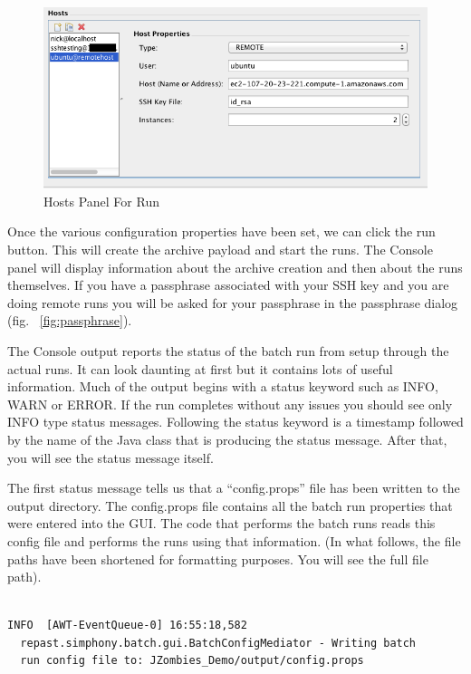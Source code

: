 \documentclass[11pt]{amsart}
\begin{document}
\begin{figure}[h]
\begin{center}
\vspace{.2in}
\centerline {
\includegraphics[width=6in]{images/hosts_panel_run.png}
}
\caption{Hosts Panel For Run}
\label{fig:hosts_panel_run}
\end{center}
\end{figure}


Once the various configuration properties have been set, we can click the run button. This will create the archive payload and start the runs. The Console panel will display information about the archive creation and then about the runs themselves. If you have a passphrase associated with your SSH key and you are doing remote runs you will be asked for  your passphrase in the passphrase dialog (fig. ~\ref{fig:passphrase}).

The Console output reports the status of the batch run from setup through the actual runs. It can look daunting at first but it contains lots of useful information. Much of the output begins with a status keyword such as INFO, WARN or ERROR. If the run completes without any issues you should see only INFO type status messages. Following the status keyword is a timestamp followed by the name of the Java class that is producing the status message. After that, you will see the status message itself.

The first status message tells us that a ``config.props'' file has been written to the output directory. The config.props file
contains all the batch run properties that were entered into the GUI. The code that performs the batch runs reads this config file and performs the runs using that information. (In what follows, the file paths have been shortened for formatting purposes.  You will see the full file path).

\begin{verbatim}

INFO  [AWT-EventQueue-0] 16:55:18,582
  repast.simphony.batch.gui.BatchConfigMediator - Writing batch
  run config file to: JZombies_Demo/output/config.props
\end{verbatim}
\end{document}
